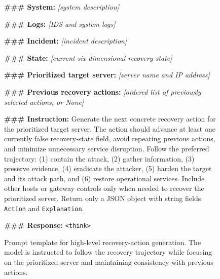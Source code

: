 \documentclass[sigconf]{acmart}
\begin{document}
\begin{figure}[t]
\centering
\begin{tcolorbox}[
  title=Recovery-Action Generation Prompt Template,
  colback=teal!5,
  colframe=teal!60,
  boxrule=0.5pt,
  arc=2pt,
  left=5pt,
  right=5pt,
  top=5pt,
  bottom=5pt]
\footnotesize
\textbf{\#\#\# System:} \emph{[system description]}

\textbf{\#\#\# Logs:} \emph{[IDS and system logs]}

\textbf{\#\#\# Incident:} \emph{[incident description]}

\textbf{\#\#\# State:}
\emph{[current six-dimensional recovery state]}

\textbf{\#\#\# Prioritized target server:}
\emph{[server name and IP address]}

\textbf{\#\#\# Previous recovery actions:}
\emph{[ordered list of previously selected actions, or None]}

\textbf{\#\#\# Instruction:}
Generate the next concrete recovery action for the prioritized target server.
The action should advance at least one currently false recovery-state field,
avoid repeating previous actions, and minimize unnecessary service disruption.
Follow the preferred trajectory: (1) contain the attack, (2) gather information,
(3) preserve evidence, (4) eradicate the attacker, (5) harden the target and
its attack path, and (6) restore operational services. Include other hosts or
gateway controls only when needed to recover the prioritized server. Return
only a JSON object with string fields \texttt{Action} and
\texttt{Explanation}.

\textbf{\#\#\# Response:}
\texttt{<think>}
\end{tcolorbox}
\caption{Prompt template for high-level recovery-action generation. The model
is instructed to follow the recovery trajectory while focusing on the
prioritized server and maintaining consistency with previous actions.}
\label{fig:action-prompt}
\end{figure}
\end{document}

